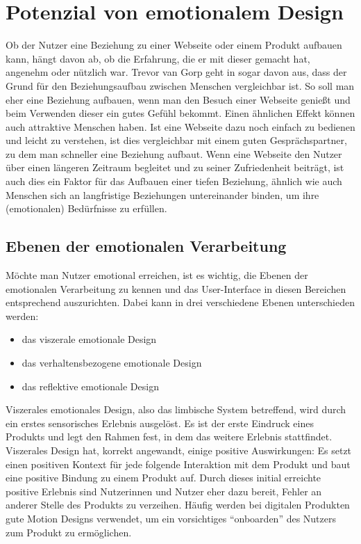 \documentclass[./dokumentation.tex]{subfiles}
\begin{document}
\chapter{Potenzial von emotionalem Design}
Ob der Nutzer eine Beziehung zu einer Webseite oder einem Produkt aufbauen kann, hängt davon ab, ob die Erfahrung, die er mit dieser gemacht hat, angenehm oder nützlich war. Trevor van Gorp geht in \cite{vanGorp2013} sogar davon aus, dass der Grund für den Beziehungsaufbau zwischen Menschen vergleichbar ist. So soll man eher eine Beziehung aufbauen, wenn man den Besuch einer Webseite genießt und beim Verwenden dieser ein gutes Gefühl bekommt. Einen ähnlichen Effekt können auch attraktive Menschen haben. Ist eine Webseite dazu noch einfach zu bedienen und leicht zu verstehen, ist dies vergleichbar mit einem guten Gesprächspartner, zu dem man schneller eine Beziehung aufbaut. Wenn eine Webseite den Nutzer über einen längeren Zeitraum begleitet und zu seiner Zufriedenheit beiträgt, ist auch dies ein Faktor für das Aufbauen einer tiefen Beziehung, ähnlich wie auch Menschen sich an langfristige Beziehungen untereinander binden, um ihre (emotionalen) Bedürfnisse zu erfüllen. \cite{vanGorp2013}

\section{Ebenen der emotionalen Verarbeitung}
Möchte man Nutzer emotional erreichen, ist es wichtig, die Ebenen der emotionalen Verarbeitung zu kennen und das User-Interface in diesen Bereichen entsprechend auszurichten. Dabei kann in drei verschiedene Ebenen unterschieden werden:
\begin{itemize}
    \item das viszerale emotionale Design
    \item das verhaltensbezogene emotionale Design
    \item das reflektive emotionale Design
\end{itemize}

Viszerales emotionales Design, also das limbische System betreffend, wird durch ein erstes sensorisches Erlebnis ausgelöst. Es ist der erste Eindruck eines Produkts und legt den Rahmen fest, in dem das weitere Erlebnis stattfindet. Viszerales Design hat, korrekt angewandt, einige positive Auswirkungen: Es setzt einen positiven Kontext für jede folgende Interaktion mit dem Produkt und baut eine positive Bindung zu einem Produkt auf. Durch dieses initial erreichte positive Erlebnis sind Nutzerinnen und Nutzer eher dazu bereit, Fehler an anderer Stelle des Produkts zu verzeihen.
Häufig werden bei digitalen Produkten gute Motion Designs verwendet, um ein vorsichtiges “onboarden” des Nutzers zum Produkt zu ermöglichen\cite{medium_muz}.  
\end{document}
